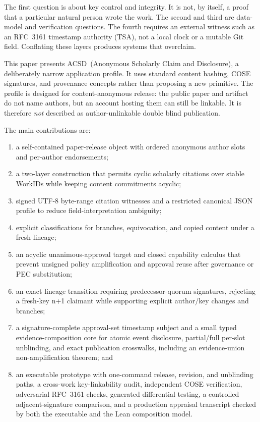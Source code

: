 \documentclass[11pt]{article}
\newcommand{\workid}{\textsf{WorkID}}
\newcommand{\acsd}{\textsc{ACSD}}
\begin{document}
The first question is about key control and integrity. It is not, by itself, a proof that a particular natural person wrote the work. The second and third are data-model and verification questions. The fourth requires an external witness such as an RFC~3161 timestamp authority (TSA), not a local clock or a mutable Git field. Conflating these layers produces systems that overclaim.

This paper presents \acsd\ (Anonymous Scholarly Claim and Disclosure), a deliberately narrow application profile. It uses standard content hashing, COSE signatures, and provenance concepts rather than proposing a new primitive. The profile is designed for content-anonymous release: the public paper and artifact do not name authors, but an account hosting them can still be linkable. It is therefore \emph{not} described as author-unlinkable double blind publication.

The main contributions are:

\begin{enumerate}
  \item a self-contained paper-release object with ordered anonymous author slots and per-author endorsements;
  \item a two-layer construction that permits cyclic scholarly citations over stable \workid s while keeping content commitments acyclic;
  \item signed UTF-8 byte-range citation witnesses and a restricted canonical JSON profile to reduce field-interpretation ambiguity;
  \item explicit classifications for branches, equivocation, and copied content under a fresh lineage;
  \item an acyclic unanimous-approval target and closed capability calculus that prevent unsigned policy amplification and approval reuse after governance or PEC substitution;
  \item an exact lineage transition requiring predecessor-quorum signatures, rejecting a fresh-key n+1 claimant while supporting explicit author/key changes and branches;
  \item a signature-complete approval-set timestamp subject and a small typed
        evidence-composition core for atomic event disclosure, partial/full
        per-slot unblinding, and exact publication crosswalks, including an
        evidence-union non-amplification theorem; and
  \item an executable prototype with one-command release, revision, and
        unblinding paths, a cross-work key-linkability audit, independent COSE
        verification, adversarial RFC~3161 checks, generated differential
        testing, a controlled adjacent-signature comparison, and a production
        appraisal transcript checked by both the executable and the Lean
        composition model.
\end{enumerate}
\end{document}
